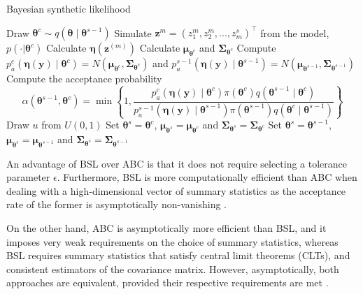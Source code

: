 \begin{algorithm}
	\caption{Bayesian synthetic likelihood}\label{BSL0}
	\begin{algorithmic}[1]
			\State Draw $\boldsymbol{\theta}^c\sim q(\boldsymbol{\theta}\mid \boldsymbol{\theta}^{s-1})$
				\State Simulate ${\boldsymbol z}^{m}=(z_{1}^{m},z_{2}^{m},...,z_{m}^{s})^{\top}$ from the model, $p(\cdot|{\boldsymbol{\theta} }^c)$
				\State Calculate $\boldsymbol{\eta}(\boldsymbol{z}^{(m)})$
			\EndFor 			 
			\State Calculate $\boldsymbol{\mu}_{\boldsymbol{\theta}^c}$ and $\boldsymbol{\Sigma}_{\boldsymbol{\theta}^c}$
			\State Compute $p_a^c(\boldsymbol{\eta}(\boldsymbol{y})\mid \boldsymbol{\theta}^c) = N(\boldsymbol{\mu}_{\boldsymbol{\theta}^c}, \boldsymbol{\Sigma}_{\boldsymbol{\theta}^c})$ and $p_a^{s-1}(\boldsymbol{\eta}(\boldsymbol{y})\mid \boldsymbol{\theta}^{s-1}) = N(\boldsymbol{\mu}_{\boldsymbol{\theta}^{s-1}}, \boldsymbol{\Sigma}_{\boldsymbol{\theta}^{s-1}})$
			\State Compute the acceptance probability
			$$\alpha(\boldsymbol{\theta}^{s-1},\boldsymbol{\theta}^c)=\min\left\{1,\frac{p_a^c(\boldsymbol{\eta}(\boldsymbol{y})\mid \boldsymbol{\theta}^c)\pi(\boldsymbol{\theta}^c)q(\boldsymbol{\theta}^{s-1}\mid \boldsymbol{\theta}^{c})}{p_a^{s-1}(\boldsymbol{\eta}(\boldsymbol{y})\mid \boldsymbol{\theta}^{s-1})\pi(\boldsymbol{\theta}^{s-1})q(\boldsymbol{\theta}^{c}\mid \boldsymbol{\theta}^{s-1})}\right\}$$
			\State Draw $u$ from $U(0,1)$
				\State Set $\boldsymbol{\theta}^{s}=\boldsymbol{\theta}^{c}$, $\boldsymbol{\mu}_{\boldsymbol{\theta}^{s}}=\boldsymbol{\mu}_{\boldsymbol{\theta}^c}$ and $\boldsymbol{\Sigma}_{\boldsymbol{\theta}^s}=\boldsymbol{\Sigma}_{\boldsymbol{\theta}^c}$
			\Else
				\State Set $\boldsymbol{\theta}^{s}=\boldsymbol{\theta}^{s-1}$, $\boldsymbol{\mu}_{\boldsymbol{\theta}^{s}}=\boldsymbol{\mu}_{\boldsymbol{\theta}^{s-1}}$ and $\boldsymbol{\Sigma}_{\boldsymbol{\theta}^s}=\boldsymbol{\Sigma}_{\boldsymbol{\theta}^{s-1}}$
			\EndIf  
		\EndFor
	\end{algorithmic}
\end{algorithm}

An advantage of BSL over ABC is that it does not require selecting a tolerance parameter $\epsilon$. Furthermore, BSL is more computationally efficient than ABC when dealing with a high-dimensional vector of summary statistics as the acceptance rate of the former is asymptotically non-vanishing \cite{nott2023bayesian}.  

On the other hand, ABC is asymptotically more efficient than BSL, and it imposes very weak requirements on the choice of summary statistics, whereas BSL requires summary statistics that satisfy central limit theorems (CLTs), and consistent estimators of the covariance matrix. However, asymptotically, both approaches are equivalent, provided their respective requirements are met \cite{martin2024approximating}.  

